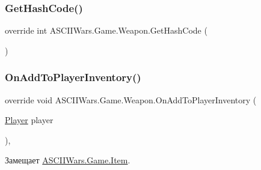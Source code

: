 \hypertarget{class_a_s_c_i_i_wars_1_1_game_1_1_weapon_af252081d5a5f047785ed545946bb5214}{}\label{class_a_s_c_i_i_wars_1_1_game_1_1_weapon_af252081d5a5f047785ed545946bb5214} 
\subsubsection{\texorpdfstring{Get\+Hash\+Code()}{GetHashCode()}}
{\footnotesize\ttfamily override int A\+S\+C\+I\+I\+Wars.\+Game.\+Weapon.\+Get\+Hash\+Code (\begin{DoxyParamCaption}{ }\end{DoxyParamCaption})\hspace{0.3cm}{\ttfamily [inline]}}

\hypertarget{class_a_s_c_i_i_wars_1_1_game_1_1_weapon_ad29135a3edb4ea03f29163d788364299}{}\label{class_a_s_c_i_i_wars_1_1_game_1_1_weapon_ad29135a3edb4ea03f29163d788364299} 
\subsubsection{\texorpdfstring{On\+Add\+To\+Player\+Inventory()}{OnAddToPlayerInventory()}}
{\footnotesize\ttfamily override void A\+S\+C\+I\+I\+Wars.\+Game.\+Weapon.\+On\+Add\+To\+Player\+Inventory (\begin{DoxyParamCaption}\item[{\hyperlink{class_a_s_c_i_i_wars_1_1_game_1_1_player}{Player}}]{player }\end{DoxyParamCaption})\hspace{0.3cm}{\ttfamily [inline]}, {\ttfamily [virtual]}}



Замещает \hyperlink{class_a_s_c_i_i_wars_1_1_game_1_1_item_aec0355b7a9f647ef24897b95563f70d1}{A\+S\+C\+I\+I\+Wars.\+Game.\+Item}.

\hypertarget{class_a_s_c_i_i_wars_1_1_game_1_1_weapon_aa03a588bfb93fbf63d4d7bf63ce62ae1}{}\label{class_a_s_c_i_i_wars_1_1_game_1_1_weapon_aa03a588bfb93fbf63d4d7bf63ce62ae1} 
